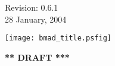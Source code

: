 \thispagestyle{empty}

\begin{flushright}
\large
  Revision: 0.6.1 \\
  28 January, 2004 \\
\end{flushright}

\vfill

{
\begin{center}
\texttt{[image: bmad\_title.psfig]} \\
\end{center}
}

\vskip 1in
\begin{center}
{\Huge \bf *** DRAFT ***}
\end{center}
\vfill
\break